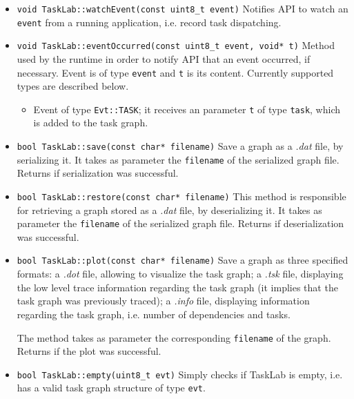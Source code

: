 \begin{itemize}
\item\texttt{void TaskLab::watchEvent(const uint8\_t event)} \newline
Notifies API to watch an \texttt{event} from a running application, i.e. record task dispatching.

\item\texttt{void TaskLab::eventOccurred(const uint8\_t event, void* t)} \newline
Method used by the runtime in order to notify API that an event occurred, if necessary. Event is of type \texttt{event} and \texttt{t} is its content. Currently supported types are described below.
\begin{itemize} 
\item Event of type \texttt{Evt::TASK}; it receives an parameter \texttt{t} of type \texttt{task}, which is added to the task graph.
\end{itemize}

\item \texttt{bool TaskLab::save(const char* filename)} \newline
Save a graph as a \textit{.dat} file, by serializing it. It takes as parameter the \texttt{filename} of the serialized graph file. Returns if serialization was successful.

\item \texttt{bool TaskLab::restore(const char* filename)} \newline
This method is responsible for retrieving a graph stored as a \textit{.dat} file, by deserializing it. It takes as parameter the \texttt{filename} of the serialized graph file. Returns if deserialization was successful.

\item \texttt{bool TaskLab::plot(const char* filename)} \newline
Save a graph as three specified formats: a \textit{.dot} file, allowing to visualize the task graph; a \textit{.tsk} file, displaying the low level trace information regarding the task graph (it implies that the task graph was previously traced); a \textit{.info} file, displaying information regarding the task graph, i.e. number of dependencies and tasks. 

The method takes as parameter the corresponding \texttt{filename} of the graph. Returns if the plot was successful. 

\item \texttt{bool TaskLab::empty(uint8\_t evt)} \newline
Simply checks if TaskLab is empty, i.e. has a valid task graph structure of type \texttt{evt}.
\end{itemize}

